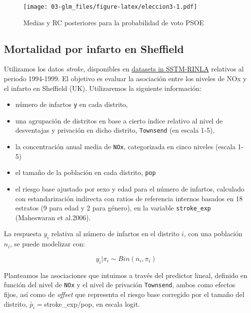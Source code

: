 \documentclass[
]{book}
\providecommand{\tightlist}{%
  \setlength{\itemsep}{0pt}\setlength{\parskip}{0pt}}
\begin{document}
\begin{figure}
\centering
\texttt{[image: 03-glm\_files/figure-latex/eleccion3-1.pdf]}
\caption{\label{fig:eleccion3}Medias y RC posteriores para la probabilidad de voto PSOE}
\end{figure}

\hypertarget{mortalidad-por-infarto-en-sheffield}{%
\subsection{Mortalidad por infarto en Sheffield}\label{mortalidad-por-infarto-en-sheffield}}

Utilizamos los datos \emph{stroke}, disponibles en \href{https://sites.google.com/a/r-inla.org/stbook/datasets}{datasets in
SSTM-RINLA} relativos al periodo 1994-1999. El objetivo es evaluar la asociación entre los niveles de
NOx y el infarto en Sheffield (UK). Utilizaremos la siguiente información:

\begin{itemize}
\tightlist
\item
  número de infartos \texttt{y} en cada distrito,
\item
  una agrupación de distritos en base a cierto índice relativo al nivel de desventajas y privación en dicho distrito, \texttt{Townsend} (en escala 1-5),
\item
  la concentración anual media de \texttt{NOx}, categorizada en cinco niveles (escala 1-5)
\item
  el tamaño de la población en cada distrito, \texttt{pop}
\item
  el riesgo base ajustado por sexo y edad para el número de infartos, calculado con estandarización indirecta con ratios de referencia internos basados en 18 estratos (9 para edad y 2 para género), en la variable \texttt{stroke\_exp} (Maheswaran et al.2006).
\end{itemize}

La respuesta \(y_{i}\) relativa al número de infartos en el distrito \(i\), con una población \(n_i\), se puede modelizar con:

\[y_i|\pi_i \sim Bin(n_i, \pi_i)\]

Planteamos las asociaciones que intuimos a través del predictor lineal, definido en función del nivel de \texttt{NOx} y el nivel de privación \texttt{Townsend}, ambos como efectos fijos, así como de \emph{offset} que representa el riesgo base corregido por el tamaño del distrito, \(\tilde{p_i}=\)stroke\_exp/pop, en escala logit.
\end{document}

